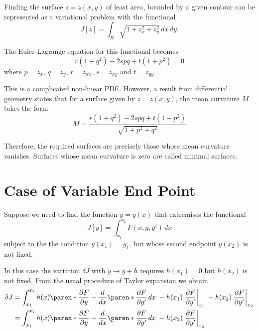 \documentclass[11pt]{penrose}
\begin{document}
\begin{negg}
    Finding the surface $z = z(x,y)$ of least area, bounded by a given contour can be represented as a variational problem with the functional
    \begin{equation}
        J[z] = \int_{R} \sqrt{1 + z_{x}^{2} + z_{y}^{2}} \,dx\,dy.
    \end{equation}

    The Euler-Lagrange equation for this functional becomes
    \begin{equation}
        r (1 + q^2) - 2spq + t(1 + p^2) = 0
    \end{equation}
    where $p = z_x$, $q = z_y$, $r = z_{xx}$, $s = z_{xy}$ and $t = z_{yy}$.

    This is a complicated non-linear PDE. However, a result from differential geometry states that for a surface given by $z = z(x,y)$, the mean curvature $M$ takes the form
    \begin{equation}
        M = \frac{r (1 + q^2) - 2spq + t(1 + p^2)}{\sqrt{1 + p^2 + q^2}}
    \end{equation}

    Therefore, the required surfaces are precisely those whose mean curvature vanishes. Surfaces whose mean curvature is zero are called minimal surfaces.
\end{negg}

\section{Case of Variable End Point}
Suppose we need to find the function $y = y(x)$ that extremises the functional
\begin{equation}
    J[y] = \int_{x_1}^{x_2} F(x, y, y') \,dx
\end{equation}
subject to the the condition $y(x_1) = y_1$, but whose second endpoint $y(x_2)$ is not fixed.

In this case the variation $\delta J$ with $y \to y+h$ requires $h(x_1) = 0$ but $h(x_2)$ is not fixed. From the usual procedure of Taylor expansion we obtain
\begin{align}
    \delta J
    &= \int_{x_1}^{x_2} h(x) \paren*{ \frac{\pd F}{\pd y} - \frac{d}{dx}\paren*{\frac{\pd F}{\pd y'}} } \,dx
    \;- h(x_1) \left.\frac{\pd F}{\pd y'}\right|_{x_1}
    \;- h(x_2) \left.\frac{\pd F}{\pd y'}\right|_{x_2}\\
    &= \int_{x_1}^{x_2} h(x) \paren*{ \frac{\pd F}{\pd y} - \frac{d}{dx}\paren*{\frac{\pd F}{\pd y'}} } \,dx
    \;- h(x_2) \left.\frac{\pd F}{\pd y'}\right|_{x_2}
\end{align}
\end{document}
